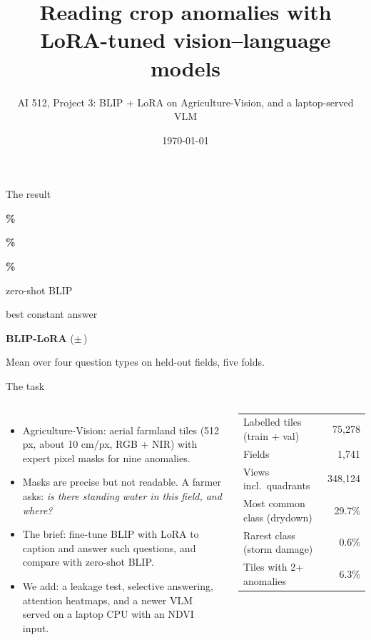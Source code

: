 \documentclass[aspectratio=169,10pt,t]{beamer}
\title{Reading crop anomalies with LoRA-tuned vision--language models}
\subtitle{AI 512, Project 3: BLIP + LoRA on Agriculture-Vision, and a laptop-served VLM}
\date{\today}
\newcommand{\bignum}[2]{\begin{minipage}[t]{0.3\textwidth}\centering
  {\fontsize{34}{36}\selectfont\bfseries\color{#1}#2}\end{minipage}}
\begin{document}
{\frame{\titlepage}}

\begin{frame}{The result}
\vfill
\centering
\bignum{muted}{\zeroMean\%}\hfill\bignum{muted}{\constMean\%}\hfill\bignum{field}{\blipCorrMean\%}\par\medskip
\begin{minipage}[t]{0.3\textwidth}\centering zero-shot BLIP\end{minipage}\hfill
\begin{minipage}[t]{0.3\textwidth}\centering best constant answer\end{minipage}\hfill
\begin{minipage}[t]{0.3\textwidth}\centering\textbf{BLIP-LoRA} ($\pm$\,\blipCorrMeanStd)\end{minipage}
\vfill
{\color{muted}Mean over four question types on held-out fields, five folds.}
\vfill
\end{frame}

\begin{frame}{The task}
\begin{columns}[T]
\begin{itemize}
\item Agriculture-Vision: aerial farmland tiles (512 px, about 10 cm/px, RGB + NIR) with expert pixel masks for nine anomalies.
\item Masks are precise but not readable. A farmer asks: \emph{is there standing water in this field, and where?}
\item The brief: fine-tune BLIP with LoRA to caption and answer such questions, and compare with zero-shot BLIP.
\item We add: a leakage test, selective answering, attention heatmaps, and a newer VLM served on a laptop CPU with an NDVI input.
\end{itemize}
\small
\begin{tabular}{lr}
\toprule
Labelled tiles (train + val) & 75,278 \\
Fields & 1,741 \\
Views incl.\ quadrants & 348,124 \\
Most common class (drydown) & 29.7\% \\
Rarest class (storm damage) & 0.6\% \\
Tiles with 2+ anomalies & 6.3\% \\
\bottomrule
\end{tabular}
\end{columns}
\end{frame}
\end{document}
